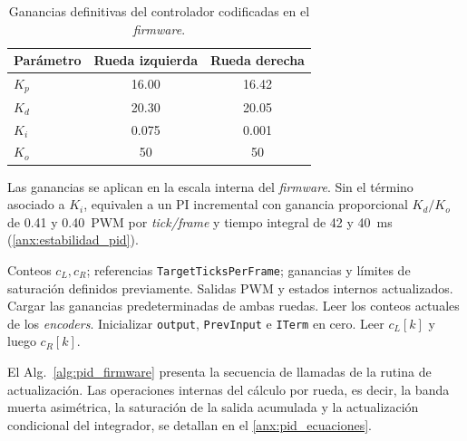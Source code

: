 \begin{table}[htbp]
\centering
\caption{Ganancias definitivas del controlador codificadas en el \textit{firmware}.}
\label{tab:ganancias_pid}
\small
\begin{tabular}{lcc}
\toprule
\textbf{Parámetro} & \textbf{Rueda izquierda} & \textbf{Rueda derecha} \\
\midrule
$K_p$ & 16.00 & 16.42 \\
$K_d$ & 20.30 & 20.05 \\
$K_i$ & 0.075 & 0.001 \\
$K_o$ & 50 & 50 \\
\bottomrule
\end{tabular}
\vspace{3pt}
\parbox{0.85\linewidth}{\footnotesize Las ganancias se aplican en la escala interna del \textit{firmware}. Sin el término asociado a $K_i$, equivalen a un PI incremental con ganancia proporcional $K_d/K_o$ de 0.41 y 0.40~PWM por \textit{tick/frame} y tiempo integral de 42 y 40~ms (\ref{anx:estabilidad_pid}).}
\end{table}

\begin{algorithm}[htbp]
\caption{Rutinas de reinicio y actualización del controlador discreto ejecutadas por el \textit{firmware}.}
\label{alg:pid_firmware}
\begin{algorithmic}[1]
\Require Conteos $c_L,c_R$; referencias \texttt{TargetTicksPerFrame}; ganancias y límites de saturación definidos previamente.
\Ensure Salidas PWM y estados internos actualizados.
\State Cargar las ganancias predeterminadas de ambas ruedas.
\State Leer los conteos actuales de los {\itshape encoders\/}.
\State Inicializar \texttt{output}, \texttt{PrevInput} e \texttt{ITerm} en cero.
\EndProcedure
\Statex
{}
\State Leer $c_L[k]$ y luego $c_R[k]$.
\State {}
\EndIf
\State \Return
\EndIf
\State {}
\State {}
\State {}
\EndProcedure
\end{algorithmic}
\end{algorithm}

El Alg.~\ref{alg:pid_firmware} presenta la secuencia de llamadas de la rutina de actualización. Las operaciones internas del cálculo por rueda, es decir, la banda muerta asimétrica, la saturación de la salida acumulada y la actualización condicional del integrador, se detallan en el \ref{anx:pid_ecuaciones}.

